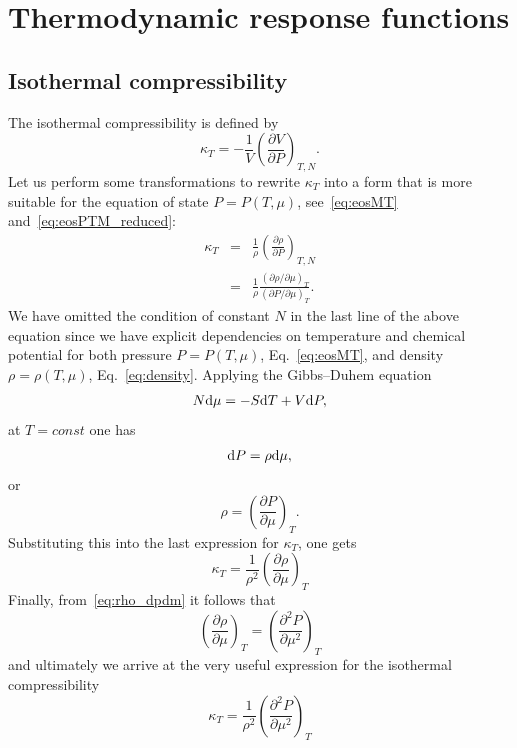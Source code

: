 \section{\label{sec:respons_functions}Thermodynamic response functions}

\subsection{Isothermal compressibility}
The isothermal compressibility is defined by
\begin{equation}
	\label{def:isotherm_compres}
	\kappa_T = -\frac{1}{V}\left(\frac{\partial V}{\partial P}\right)_{T, N}.
\end{equation}
Let us perform some transformations to rewrite $\kappa_T$ into a form that is more suitable for the equation of state $P=P(T,\mu)$, see~\eqref{eq:eosMT} and~\eqref{eq:eosPTM_reduced}:
\begin{eqnarray*}
	\kappa_T	& = & \frac{1}{\rho} \left(\frac{\partial \rho}{\partial P} \right)_{T,N}
	\\
	& = & \frac{1}{\rho} \frac{\left(\partial \rho / \partial \mu\right)_{T}}
	{\left(\partial P / \partial \mu\right)_{T}}.
\end{eqnarray*}
We have omitted the condition of constant $N$ in the last line of the above equation since we have explicit dependencies on temperature and chemical potential for both pressure $P = P(T, \mu)$, Eq.~\eqref{eq:eosMT}, and density $\rho = \rho(T, \mu)$, Eq.~\eqref{eq:density}.
Applying the Gibbs--Duhem equation
\begin{equation}
	N{\rm d}\mu = -S{\rm d}T + V{\rm d}P,
\end{equation}
at $T = const$ one has 
\begin{equation*}
	{\rm d} P = \rho {\rm d} \mu,
\end{equation*}
or
\begin{equation}
	\label{eq:rho_dpdm}
	\rho = \left(\frac{\partial P}{\partial \mu}\right)_T.
\end{equation}
Substituting this into the last expression for $\kappa_T$, one gets
\begin{equation}
	\kappa_T = \frac{1}{\rho^2} \left(\frac{\partial \rho}{\partial \mu}\right)_{T}
\end{equation}
Finally, from~\eqref{eq:rho_dpdm} it follows that
\begin{equation}
	\left(\frac{\partial \rho}{\partial \mu}\right)_T = \left(\frac{\partial^2 P}{\partial \mu^2}\right)_T
\end{equation}
and ultimately we arrive at the very useful expression for the isothermal compressibility
\begin{equation}
	\kappa_T = \frac{1}{\rho^2} \left(\frac{\partial^2 P}{\partial \mu^2}\right)_{T}
\end{equation}

